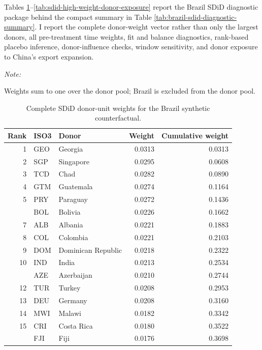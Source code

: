 \documentclass[referee,pdflatex,sn-basic]{sn-jnl}
\theoremstyle{thmstylethree}
\begin{document}
Tables \ref{tab:sdid-unit-weights-complete}--\ref{tab:sdid-high-weight-donor-exposure} report the Brazil SDiD diagnostic package behind the compact summary in Table \ref{tab:brazil-sdid-diagnostic-summary}. I report the complete donor-weight vector rather than only the largest donors, all pre-treatment time weights, fit and balance diagnostics, rank-based placebo inference, donor-influence checks, window sensitivity, and donor exposure to China's export expansion.

\begingroup\fontsize{7}{9}\selectfont

\begin{ThreePartTable}
\begin{TableNotes}
\item \textit{Note: } 
\item Weights sum to one over the donor pool; Brazil is excluded from the donor pool.
\end{TableNotes}
\begin{longtable}[t]{rllrr}
\caption{\label{tab:sdid-unit-weights-complete}Complete SDiD donor-unit weights for the Brazil synthetic counterfactual.}\\
\toprule
Rank & ISO3 & Donor & Weight & Cumulative weight\\
\midrule
1 & GEO & Georgia & 0.0313 & 0.0313\\
2 & SGP & Singapore & 0.0295 & 0.0608\\
3 & TCD & Chad & 0.0282 & 0.0890\\
4 & GTM & Guatemala & 0.0274 & 0.1164\\
5 & PRY & Paraguay & 0.0272 & 0.1436\\
\addlinespace
6 & BOL & Bolivia & 0.0226 & 0.1662\\
7 & ALB & Albania & 0.0221 & 0.1883\\
8 & COL & Colombia & 0.0221 & 0.2103\\
9 & DOM & Dominican Republic & 0.0218 & 0.2322\\
10 & IND & India & 0.0213 & 0.2534\\
\addlinespace
11 & AZE & Azerbaijan & 0.0210 & 0.2744\\
12 & TUR & Turkey & 0.0208 & 0.2953\\
13 & DEU & Germany & 0.0208 & 0.3160\\
14 & MWI & Malawi & 0.0182 & 0.3342\\
15 & CRI & Costa Rica & 0.0180 & 0.3522\\
\addlinespace
16 & FJI & Fiji & 0.0176 & 0.3698\\

\end{longtable}
\end{ThreePartTable}
\end{document}
